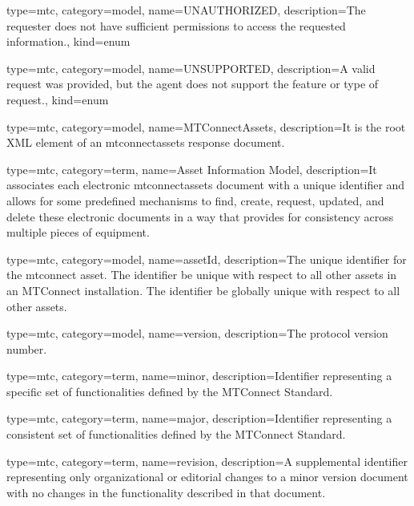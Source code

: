 {
  type=mtc,
  category=model,
  name={UNAUTHORIZED},
  description={The \gls{requester} does not have sufficient permissions to access the requested information.},
  kind={enum}
}

{
  type=mtc,
  category=model,
  name={UNSUPPORTED},
  description={A valid \gls{request} was provided, but the \gls{agent} does not support the feature or type of \gls{request}.},
  kind={enum}
}













{
  type=mtc,
  category=model,
  name={MTConnectAssets},
  description={It is the root XML element of an \gls{mtconnectassets response document}.}
}


{
  type=mtc,
  category=term,
  name={Asset Information Model},
  description={It associates each electronic \gls{mtconnectassets} document with a unique identifier and allows for some predefined mechanisms to find, create, request, updated, and delete these electronic documents in a way that provides for consistency across multiple pieces of equipment.}
}


{
  type=mtc,
  category=model,
  name={assetId},
  description={The unique identifier for the \gls{mtconnect asset}. The identifier \MUST be unique with respect to all other \glspl{asset} in an MTConnect installation. The identifier \SHOULD be globally unique with respect to all other \glspl{asset}.}
}


{
  type=mtc,
  category=model,
  name={version},
  description={The protocol version number.}
}

{
  type=mtc,
  category=term,
  name={minor},
  description={Identifier representing a specific set of functionalities defined by the MTConnect Standard.}
}



{
  type=mtc,
  category=term,
  name={major},
  description={Identifier representing a consistent set of functionalities defined by the MTConnect Standard. }
}

{
  type=mtc,
  category=term,
  name={revision},
  description={A supplemental identifier representing only organizational or editorial changes to a \gls{minor} version document with no changes in the functionality described in that document.}
}



